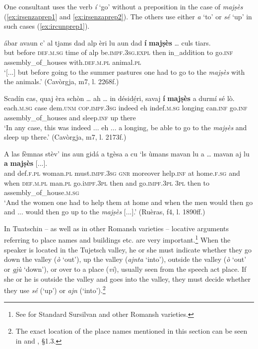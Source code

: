 One consultant uses the verb \textit{í} `go' without a preposition in the case of \textit{majṣès} (\ref{ex:irsenzaprep1} and \ref{ex:irsenzaprep2}). The others use either \textit{a} `to' or \textit{sé} `up' in such cases (\ref{ex:ircunprep1}).

\ea
\label{ex:irsenzaprep1}
\gll  [...] ábar avaun c’ al tjams dad alp èri lu aun dad \textbf{í} \textbf{majṣès} … culs tiars.  \\
{} but before {} \textsc{def.m.sg} time of alp be.\textsc{impf.3sg.expl} then in\_addition to go.\textsc{inf} assembly\_of\_houses {} with.\textsc{def.m.pl} animal.\textsc{pl}\\
\glt `[...] but before going to the summer pastures one had to go to the \textit{majṣès} with the animals.' (Cavòrgja, m7, l. 2268f.)
\z

\ea
\label{ex:irsenzaprep2}
\gll Scadín cas, quaj èra schòn … ah … in désidé̱ri, savaj \textbf{í} \textbf{majṣès} a durmí sé lò.\\
each.\textsc{m.sg} case dem.\textsc{unm} \textsc{cop.impf.3sg} indeed {} eh {} indef.\textsc{m.sg} longing can.\textsc{inf} go.\textsc{inf} assembly\_of\_houses and sleep.\textsc{inf} up there\\
\glt `In any case, this was indeed ... eh ... a longing, be able to go to the \textit{majṣès} and sleep up there.' (Cavòrgja, m7, l. 2173f.)
\z

\ea
\label{ex:ircunprep1}
\gll A las fèmnas stèv’ ins aun gidá a tgèsa a cu `ls ùmans mavan lu a … mavan aj lu \textbf{a} \textbf{majṣès} [...].\\
and def.\textsc{f.pl} woman.\textsc{pl} must.\textsc{impf.3sg} \textsc{gnr} moreover help.\textsc{inf} at home.\textsc{f.sg} and when \textsc{def.m.pl} man.\textsc{pl} go.i\textsc{mpf.3pl} then and {} go.\textsc{impf.3pl} \textsc{3pl} then to assembly\_of\_house.\textsc{m.sg}\\
\glt `And the women one had to help them at home and when the men would then go and ... would then go up to the \textit{majṣès} [...].' (Ruèras, f4, l. 1890ff.)
\z

In Tuatschin -- as well as in other Romansh varieties -- locative arguments referring to place names and buildings etc. are very important.\footnote{See \citet[4-126]{Ebneter1994} for Standard Sursilvan and other Romansh varieties.} When the speaker is located in the Tujetsch valley, he or she must indicate whether they go down the valley (\textit{ò} `out'), up the valley (\textit{ajnta} `into'), outside the valley (\textit{ò} `out' or \textit{gjù} `down'), or over to a place (\textit{vi}), usually seen from the speech act place. If she or he is outside the valley and goes into the valley, they must decide whether they use \textit{sé} (`up') or \textit{ajn} (`into').\footnote{The exact location of the place names mentioned in this section can be seen in  and , §1.3.}

